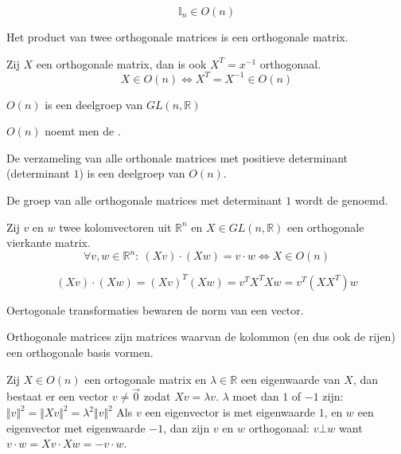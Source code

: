 \documentclass[main.tex]{subfiles}
\begin{document}
\begin{st}
  \[ \mathbb{I}_{n} \in O(n) \] 
\end{st}

\begin{st}
  Het product van twee orthogonale matrices is een orthogonale matrix.
\end{st}

\begin{st}
  Zij $X$ een orthogonale matrix, dan is ook $X^{T}=x^{-1}$ orthogonaal.
  \[ X \in O(n) \Leftrightarrow X^{T} = X^{-1} \in O(n)\]
\end{st}

\begin{st}
  $O(n)$ is een deelgroep van $GL(n,\mathbb{R})$
\end{st}

\begin{de}
  $O(n)$ noemt men de .
\end{de}

\begin{st}
  De verzameling van alle orthonale matrices met positieve determinant (determinant $1$) is een deelgroep van $O(n)$.
\end{st}

\begin{de}
  De groep van alle orthogonale matrices met determinant $1$ wordt de  genoemd.
\end{de}

\begin{st}
  Zij $v$ en $w$ twee kolomvectoren uit $\mathbb{R}^{n}$ en $X \in GL(n,\mathbb{R})$ een orthogonale vierkante matrix.
  \[ \forall v,w \in \mathbb{R}^{n}:\ (Xv)\cdot(Xw) = v \cdot w \Leftrightarrow X \in O(n) \]

\[ (Xv) \cdot (Xw) = (Xv)^{T}(Xw) = v^{T}X^{T}Xw = v^{T}(XX^{T})w \]
\end{st}

\begin{st}
  Oertogonale transformaties bewaren de norm van een vector.
\end{st}

\begin{de}
  Orthogonale matrices zijn matrices waarvan de kolommon (en dus ook de rijen) een orthogonale basis vormen.
\end{de}

\begin{st}
  Zij $X\in O(n)$ een ortogonale matrix en $\lambda\in \mathbb{R}$ een eigenwaarde van $X$, dan bestaat er een vector $v\neq \vec{0}$ zodat $Xv = \lambda v$.
  $\lambda$ moet dan $1$ of $-1$ zijn: $ \Vert v \Vert^{2} = \Vert X v \Vert^{2} = \lambda^{2}\Vert v\Vert^{2}$
  Als $v$ een eigenvector is met eigenwaarde $1$, en $w$ een eigenvector met eigenwaarde $-1$, dan zijn $v$ en $w$ orthogonaal: $v \bot w$
  want $v \cdot w = Xv \cdot Xw = -v \cdot w$.
\end{st}
\end{document}
